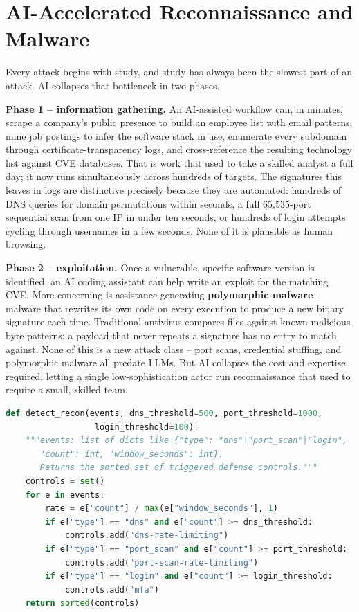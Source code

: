 \section{AI-Accelerated Reconnaissance and Malware}

Every attack begins with study, and study has always been the slowest part of an attack.
AI collapses that bottleneck in two phases.

\textbf{Phase 1 -- information gathering.} An AI-assisted workflow can, in minutes, scrape a
company's public presence to build an employee list with email patterns, mine job postings to
infer the software stack in use, enumerate every subdomain through certificate-transparency logs,
and cross-reference the resulting technology list against CVE databases. That is work that used
to take a skilled analyst a full day; it now runs simultaneously across hundreds of targets. The
signatures this leaves in logs are distinctive precisely because they are automated: hundreds of
DNS queries for domain permutations within seconds, a full 65{,}535-port sequential scan from one
IP in under ten seconds, or hundreds of login attempts cycling through usernames in a few
seconds. None of it is plausible as human browsing.

\textbf{Phase 2 -- exploitation.} Once a vulnerable, specific software version is identified, an
AI coding assistant can help write an exploit for the matching CVE. More concerning is assistance
generating \textbf{polymorphic malware} -- malware that rewrites its own code on every execution
to produce a new binary signature each time. Traditional antivirus compares files against known
malicious byte patterns; a payload that never repeats a signature has no entry to match against.
None of this is a new attack class -- port scans, credential stuffing, and polymorphic malware all
predate LLMs. But AI collapses the cost and expertise required, letting a single
low-sophistication actor run reconnaissance that used to require a small, skilled team.

\begin{lstlisting}[language=Python, caption={Flagging AI-accelerated reconnaissance signatures in a log stream}]
def detect_recon(events, dns_threshold=500, port_threshold=1000,
                  login_threshold=100):
    """events: list of dicts like {"type": "dns"|"port_scan"|"login",
       "count": int, "window_seconds": int}.
       Returns the sorted set of triggered defense controls."""
    controls = set()
    for e in events:
        rate = e["count"] / max(e["window_seconds"], 1)
        if e["type"] == "dns" and e["count"] >= dns_threshold:
            controls.add("dns-rate-limiting")
        if e["type"] == "port_scan" and e["count"] >= port_threshold:
            controls.add("port-scan-rate-limiting")
        if e["type"] == "login" and e["count"] >= login_threshold:
            controls.add("mfa")
    return sorted(controls)
\end{lstlisting}

